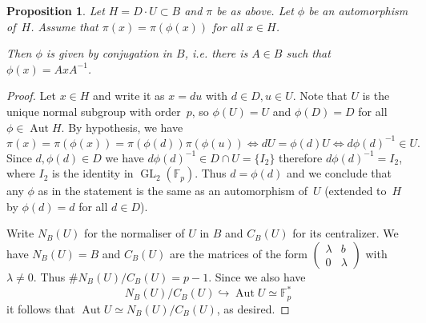 \documentclass[12pt]{amsart}
\newcommand{\F}{\mathbb{F}}
\DeclareMathOperator{\Aut}{Aut}
\newcommand{\GL}{\operatorname{GL}}
\numberwithin{equation}{section}
\newtheorem{proposition}[theorem]{Proposition}
\theoremstyle{definition}
\theoremstyle{remark}
\begin{document}
\begin{proposition} \label{P:inner}
Let $H = D \cdot U \subset B$ and $\pi$ be as above. 
Let $\phi$ be an automorphism of~$H$. Assume that  
$\pi(x) = \pi(\phi(x))$ for all $x \in H$. 

Then $\phi$ is given by conjugation in $B$, i.e. there is $A \in B$ such that $\phi(x) = AxA^{-1}$. 
\end{proposition}
\begin{proof}
Let $x \in H$ and write it as $x = du$ with $d \in D, u \in U$.
Note that $U$ is the unique normal subgroup with order~$p$, so 
$\phi(U) = U$ and $\phi(D)=D$ for all $\phi \in \Aut H$.
By hypothesis, we have 
\[
 \pi(x) = \pi(\phi(x)) = \pi(\phi(d))\pi(\phi(u)) \iff dU = \phi(d)U
 \iff d\phi(d)^{-1} \in U.
\]
Since $d, \phi(d) \in D$ we have $d\phi(d)^{-1} \in D \cap U = \{ I_2\}$ therefore $d\phi(d)^{-1} = I_2$, where $I_2$ is the identity in $\GL_2(\F_p)$.
Thus $d = \phi(d)$ and we conclude that any $\phi$ 
as in the statement is the same as an automorphism of~$U$ (extended to~$H$ by $\phi(d)=d$ for all $d\in D$). 

Write $N_B(U)$  for the normaliser of $U$ in $B$ and $C_B(U)$ for its centralizer. 
We have $N_B(U) = B$ 
and $C_B(U)$ are the matrices of the form $\left(\begin{smallmatrix}
                            \lambda & b \\
                            0 & \lambda
                            \end{smallmatrix} \right)$
with $\lambda \neq 0$. Thus $\# N_B(U)/C_B(U) = p-1$. 
Since  we also have 
\[
 N_B(U)/C_B(U) \hookrightarrow \Aut U \simeq \F_p^*
\]
it follows that $\Aut U \simeq N_B(U)/C_B(U)$, as desired.
\end{proof}
\end{document}
